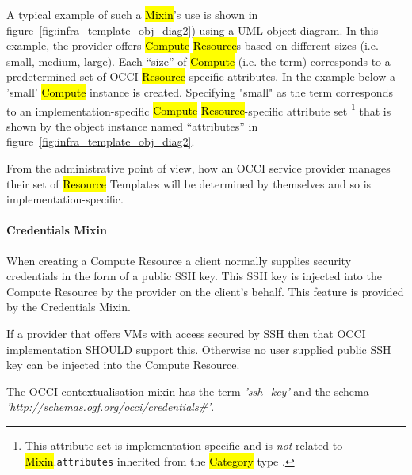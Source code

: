 \documentclass[10pt,a4paper]{article}
\begin{document}
A typical example of such a \hl{Mixin}'s use is shown in
figure~\ref{fig:infra_template_obj_diag2}) using a UML object diagram.
In this example, the provider offers \hl{Compute} \hl{Resource}s based
on different sizes (i.e. small, medium, large). Each ``size'' of
\hl{Compute} (i.e. the term) corresponds to a predetermined set of
OCCI \hl{Resource}-specific attributes. In the example below a 'small'
\hl{Compute} instance is created.  Specifying "small" as the term
corresponds to an implementation-specific \hl{Compute}
\hl{Resource}-specific attribute set%
\footnote{This attribute set is implementation-specific and is {\em
    not} related to \hl{Mixin}.{\tt attributes} inherited from the
  \hl{Category} type \cite{occi:core}.}  that is shown by the object
instance named ``attributes'' in
figure~\ref{fig:infra_template_obj_diag2}.


From the administrative point of view, how an OCCI service provider
manages their set of \hl{Resource} Templates will be determined by
themselves and so is implementation-specific.

\paragraph{Credentials Mixin}


When creating a Compute Resource a client normally supplies security credentials in the form of a public SSH key. This SSH key is injected into the Compute Resource by the provider on the client's behalf. This feature is provided by the Credentials Mixin.

If a provider that offers VMs with access secured by SSH then that OCCI implementation SHOULD support this. Otherwise no user supplied public SSH key can be injected into the Compute Resource.

The OCCI contextualisation mixin has the term \textit{'ssh\_key'} and the schema \textit{'http://schemas.ogf.org/occi/credentials\#'}.

\end{document}
